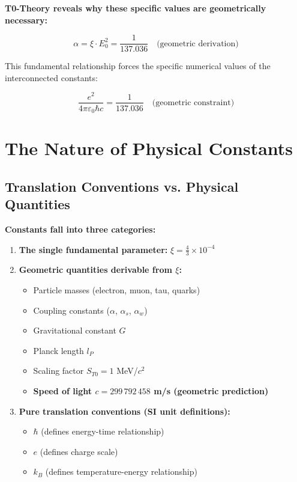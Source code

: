 \documentclass[12pt,a4paper]{article}
\begin{document}
	\begin{insight}
		\textbf{T0-Theory reveals why these specific values are geometrically necessary:}
		
		\begin{equation}
			\alpha = \xi \cdot E_0^2 = \frac{1}{137.036} \quad \text{(geometric derivation)}
		\end{equation}
		
		This fundamental relationship forces the specific numerical values of the interconnected constants:
		
		\begin{equation}
			\frac{e^2}{4\pi\varepsilon_0\hbar c} = \frac{1}{137.036} \quad \text{(geometric constraint)}
		\end{equation}
	\end{insight}
	
	\section{The Nature of Physical Constants}
	
	\subsection{Translation Conventions vs. Physical Quantities}
	
	\begin{keyresult}
		\textbf{Constants fall into three categories:}
		\begin{enumerate}
			\item \textbf{The single fundamental parameter:} $\xi = \frac{4}{3} \times 10^{-4}$
			
			\item \textbf{Geometric quantities derivable from $\xi$:}
			\begin{itemize}
				\item Particle masses (electron, muon, tau, quarks)
				\item Coupling constants ($\alpha$, $\alpha_s$, $\alpha_w$)
				\item Gravitational constant $G$
				\item Planck length $l_P$
				\item Scaling factor $S_{T0} = 1$ MeV/$c^2$
				\item \textbf{Speed of light $c = 299\,792\,458$ m/s (geometric prediction)}
			\end{itemize}
			
			\item \textbf{Pure translation conventions (SI unit definitions):}
			\begin{itemize}
				\item $\hbar$ (defines energy-time relationship)
				\item $e$ (defines charge scale)
				\item $k_B$ (defines temperature-energy relationship)
			\end{itemize}
		\end{enumerate}
	\end{keyresult}
	
\end{document}
